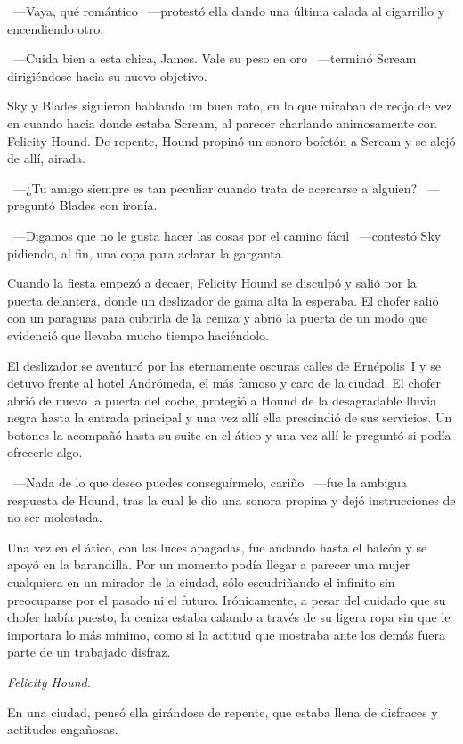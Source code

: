~---Vaya, qué romántico ~---protestó ella dando una última calada al cigarrillo y encendiendo otro.

~---Cuida bien a esta chica, James. Vale su peso en oro ~---terminó Scream dirigiéndose hacia su nuevo objetivo.

Sky y Blades siguieron hablando un buen rato, en lo que miraban de reojo de vez en cuando hacia donde estaba Scream, al parecer charlando animosamente con Felicity Hound. De repente, Hound propinó un sonoro bofetón a Scream y se alejó de allí, airada.

~---¿Tu amigo siempre es tan peculiar cuando trata de acercarse a alguien? ~---preguntó Blades con ironía.

~---Digamos que no le gusta hacer las cosas por el camino fácil ~---contestó Sky pidiendo, al fin, una copa para aclarar la garganta.

\bigskip\noindent
Cuando la fiesta empezó a decaer, Felicity Hound se disculpó y salió por la puerta delantera, donde un deslizador de gama alta la esperaba. El chofer salió con un paraguas para cubrirla de la ceniza y abrió la puerta de un modo que evidenció que llevaba mucho tiempo haciéndolo.

El deslizador se aventuró por las eternamente oscuras calles de Ernépolis~I y se detuvo frente al hotel Andrómeda, el más famoso y caro de la ciudad. El chofer abrió de nuevo la puerta del coche, protegió a Hound de la desagradable lluvia negra hasta la entrada principal y una vez allí ella prescindió de sus servicios.
Un botones la acompañó hasta su suite en el ático y una vez allí le preguntó si podía ofrecerle algo.

~---Nada de lo que deseo puedes conseguírmelo, cariño ~---fue la ambigua respuesta de Hound, tras la cual le dio una sonora propina y dejó instrucciones de no ser molestada.

Una vez en el ático, con las luces apagadas, fue andando hasta el balcón y se apoyó en la barandilla. Por un momento podía llegar a parecer una mujer cualquiera en un mirador de la ciudad, sólo escudriñando el infinito sin preocuparse por el pasado ni el futuro. Irónicamente, a pesar del cuidado que su chofer había puesto, la ceniza estaba calando a través de su ligera ropa sin que le importara lo más mínimo, como si la actitud que mostraba ante los demás fuera parte de un trabajado disfraz.

\emph{Felicity Hound.}

En una ciudad, pensó ella girándose de repente, que estaba llena de disfraces y actitudes engañosas.

